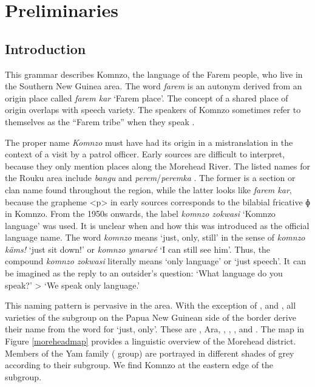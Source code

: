 
\chapter{Preliminaries}
\label{cha:The language and its speakers}

\section{Introduction}\label{prelimintro}
This grammar describes Komnzo, the language of the Farem people, who live in the Southern New Guinea area. The word \emph{farem} is an autonym derived from an origin place called \textit{farem kar} `Farem place'. The concept of a shared place of origin overlaps with speech variety. The speakers of Komnzo sometimes refer to themselves as the ``Farem tribe'' when they speak .%

The proper name \emph{Komnzo} must have had its origin in a mistranslation in the context of a visit by a patrol officer. Early sources are difficult to interpret, because they only mention places along the Morehead River. The listed names for the Rouku area include \emph{bangu} \citep[292]{Ray:1907westfly} and \emph{perem}/\emph{peremka} \citep[334]{Ray:1923westerndiv}. The former is a section or clan name found throughout the region, while the latter looks like \emph{farem kar}, because the grapheme <p> in early sources corresponds to the bilabial fricative ɸ in Komnzo. From the 1950s onwards, the label \emph{komnzo zokwasi} `Komnzo language' was used. It is unclear when and how this was introduced as the official language name. The word \emph{komnzo} means `just, only, still' in the sense of \emph{komnzo käms!} `just sit down!' or \emph{komnzo ymarwé} `I can still see him'. Thus, the compound \emph{komnzo zokwasi} literally means `only language' or `just speech'. It can be imagined as the reply to an outsider's question: `What language do you speak?' > `We speak only language.'%

This naming pattern is pervasive in the area. With the exception of ,  and , all varieties of the  subgroup on the Papua New Guinean side of the border derive their name from the word for `just, only'. These are , Ara, , , ,  and . The map in Figure \ref{moreheadmap} provides a linguistic overview of the Morehead district. Members of the Yam family ( group) are portrayed in different shades of grey according to their subgroup. We find Komnzo at the eastern edge of the  subgroup.

